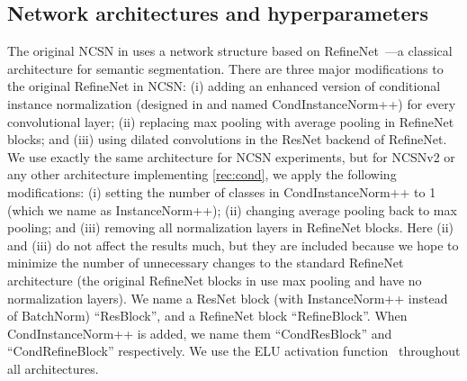 \documentclass{article}
\begin{document}
\subsection{Network architectures and hyperparameters}\label{app:arch}
The original NCSN in \cite{song2019generative} uses a network structure based on RefineNet~\cite{lin2017refinenet}---a classical architecture for semantic segmentation. There are three major modifications to the original RefineNet in NCSN: (i) adding an enhanced version of conditional instance normalization (designed in \cite{song2019generative} and named CondInstanceNorm++) for every convolutional layer; (ii) replacing max pooling with average pooling in RefineNet blocks; and (iii) using dilated convolutions in the ResNet backend of RefineNet. We use exactly the same architecture for NCSN experiments, but for NCSNv2 or any other architecture implementing \cref{rec:cond}, we apply the following modifications: (i) setting the number of classes in CondInstanceNorm++ to 1 (which we name as InstanceNorm++); (ii) changing average pooling back to max pooling; and (iii) removing all normalization layers in RefineNet blocks. Here (ii) and (iii) do not affect the results much, but they are included because we hope to minimize the number of unnecessary changes to the standard RefineNet architecture (the original RefineNet blocks in \cite{lin2017refinenet} use max pooling and have no normalization layers). We name a ResNet block (with InstanceNorm++ instead of BatchNorm) ``ResBlock'', and a RefineNet block ``RefineBlock''. When CondInstanceNorm++ is added, we name them ``CondResBlock'' and ``CondRefineBlock'' respectively. We use the ELU activation function~\cite{clevert2015fast} throughout all architectures.
\end{document}
